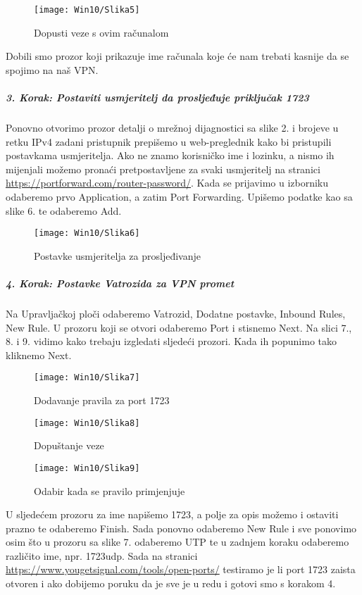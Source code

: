 \FloatBarrier
\begin{figure}[h!]
	\centering
     \texttt{[image: Win10/Slika5]}
     \caption{Dopusti veze s ovim računalom}
\end{figure}
\FloatBarrier
Dobili smo prozor koji prikazuje ime računala koje će nam trebati kasnije da se spojimo na naš VPN.
\FloatBarrier
\newpage
\subparagraph{3. Korak: Postaviti usmjeritelj da prosljeđuje priključak 1723}
\hfill \smallbreak
Ponovno otvorimo prozor detalji o mrežnoj dijagnostici sa slike 2. i brojeve u retku IPv4 zadani pristupnik prepišemo u web-preglednik kako bi pristupili postavkama usmjeritelja. Ako ne znamo korisničko ime i lozinku, a nismo ih mijenjali možemo pronaći pretpostavljene za svaki usmjeritelj na stranici \\ \url{https://portforward.com/router-password/}. 
Kada se prijavimo u izborniku odaberemo prvo Application, a zatim Port Forwarding. Upišemo podatke kao sa slike 6. te odaberemo Add.
\FloatBarrier
\begin{figure}[h!]
	\centering
     \texttt{[image: Win10/Slika6]}
     \caption{Postavke usmjeritelja za prosljeđivanje}
\end{figure}
\FloatBarrier
\subparagraph{4. Korak: Postavke Vatrozida za VPN promet}
\hfill \smallbreak
Na Upravljačkoj ploči odaberemo Vatrozid, Dodatne postavke, Inbound Rules, New Rule. U prozoru koji se otvori odaberemo Port i stisnemo Next. Na slici 7., 8. i 9. vidimo kako trebaju izgledati sljedeći prozori. Kada ih popunimo tako kliknemo Next.
\FloatBarrier
\begin{figure}[h!]
	\centering
     \texttt{[image: Win10/Slika7]}
     \caption{Dodavanje pravila za port 1723}
\end{figure}
\FloatBarrier
\FloatBarrier
\begin{figure}[h!]
	\centering
     \texttt{[image: Win10/Slika8]}
     \caption{Dopuštanje veze}
\end{figure}
\FloatBarrier
\FloatBarrier
\begin{figure}[h!]
	\centering
     \texttt{[image: Win10/Slika9]}
     \caption{Odabir kada se pravilo primjenjuje}
\end{figure}
\FloatBarrier
U sljedećem prozoru za ime napišemo 1723, a polje za opis možemo i ostaviti prazno te odaberemo Finish. Sada ponovno odaberemo New Rule i sve ponovimo osim što u prozoru sa slike 7. odaberemo UTP te u zadnjem koraku odaberemo različito ime, npr. 1723udp. Sada na stranici \\ \url{https://www.yougetsignal.com/tools/open-ports/} testiramo je li port 1723 zaista otvoren i ako dobijemo poruku da je sve je u redu i gotovi smo s korakom 4.
